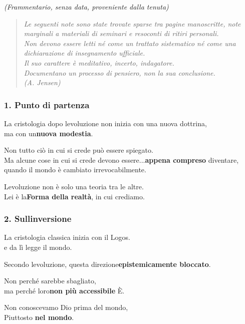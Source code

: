 \documentclass[
]{article}
\begin{document}
\emph{(Frammentario, senza data, proveniente dalla tenuta)}

\begin{quote}
\emph{Le seguenti note sono state trovate sparse tra pagine manoscritte, note marginali a materiali di seminari e resoconti di ritiri personali.\\
Non devono essere letti né come un trattato sistematico né come una dichiarazione di insegnamento ufficiale.\\
Il suo carattere è meditativo, incerto, indagatore.\\
Documentano un processo di pensiero, non la sua conclusione.\\
(A. Jensen)}
\end{quote}

\subsubsection{\texorpdfstring{\textbf{1. Punto di partenza}}{1. Punto di partenza}}\label{punto-di-partenza}

La cristologia dopo l\textquotesingle evoluzione non inizia con una nuova dottrina,\\
ma con un\textbf{nuova modestia}.

Non tutto ciò in cui si crede può essere spiegato.\\
Ma alcune cose in cui si crede devono essere...\textbf{appena compreso} diventare,\\
quando il mondo è cambiato irrevocabilmente.

L\textquotesingle evoluzione non è solo una teoria tra le altre.\\
Lei è la\textbf{Forma della realtà}, in cui crediamo.

\subsubsection{\texorpdfstring{\textbf{2. Sull\textquotesingle inversione}}{2. Sull\textquotesingle inversione}}\label{sullinversione}

La cristologia classica inizia con il Logos.\\
e da lì legge il mondo.

Secondo l\textquotesingle evoluzione, questa direzione\textbf{epistemicamente bloccato}.

Non perché sarebbe sbagliato,\\
ma perché loro\textbf{non più accessibile} È.

Non conoscevamo Dio prima del mondo,\\
Piuttosto \textbf{nel mondo}.
\end{document}
